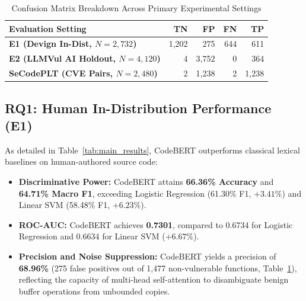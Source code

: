 \documentclass[conference]{IEEEtran}
\begin{document}
\begin{table}[htbp]
\centering
\caption{Confusion Matrix Breakdown Across Primary Experimental Settings}
\label{tab:cm_breakdown}
\begin{tabular}{@{}lrrrr@{}}
\toprule
\textbf{Evaluation Setting} & \textbf{TN} & \textbf{FP} & \textbf{FN} & \textbf{TP} \\
\midrule
\textbf{E1 (Devign In-Dist, $N=2,732$)} & 1,202 & 275 & 644 & 611 \\
\textbf{E2 (LLMVul AI Holdout, $N=4,120$)} & 4 & 3,752 & 0 & 364 \\
\textbf{SeCodePLT (CVE Pairs, $N=2,480$)} & 2 & 1,238 & 2 & 1,238 \\
\bottomrule
\end{tabular}
\end{table}

\subsection{RQ1: Human In-Distribution Performance (E1)}
As detailed in Table~\ref{tab:main_results}, CodeBERT outperforms classical lexical baselines on human-authored source code:
\begin{itemize}
    \item \textbf{Discriminative Power:} CodeBERT attains \textbf{66.36\% Accuracy} and \textbf{64.71\% Macro F1}, exceeding Logistic Regression (61.30\% F1, $+3.41\%$) and Linear SVM (58.48\% F1, $+6.23\%$).
    \item \textbf{ROC-AUC:} CodeBERT achieves \textbf{0.7301}, compared to 0.6734 for Logistic Regression and 0.6634 for Linear SVM ($+6.67\%$).
    \item \textbf{Precision and Noise Suppression:} CodeBERT yields a precision of \textbf{68.96\%} (275 false positives out of 1,477 non-vulnerable functions, Table~\ref{tab:cm_breakdown}), reflecting the capacity of multi-head self-attention to disambiguate benign buffer operations from unbounded copies.
\end{itemize}
\end{document}
